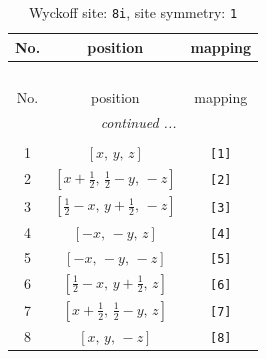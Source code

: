 \documentclass[fleqn,8pt]{jsarticle}
\begin{document}
\renewcommand{\arraystretch}{1.2}
\begin{longtable}{ccc}
\caption{Wyckoff site: {\tt 8i}, site symmetry: {\tt 1}}
 \\
 \hline \hline
No. & position & mapping \\ \hline \endfirsthead

\multicolumn{2}{l}{\tablename\ \thetable{}} \\
 \hline \hline
No. & position & mapping \\ \hline \endhead

 \hline \hline
\multicolumn{2}{r}{\footnotesize\it continued ...} \\ \endfoot

 \hline \hline
\multicolumn{2}{r}{} \\ \endlastfoot

1 & $\left[ x,\, y,\, z \right]$ & {\tt [1]} \\ \hline
2 & $\left[ x + \frac{1}{2},\, \frac{1}{2} - y,\, - z \right]$ & {\tt [2]} \\ \hline
3 & $\left[ \frac{1}{2} - x,\, y + \frac{1}{2},\, - z \right]$ & {\tt [3]} \\ \hline
4 & $\left[ - x,\, - y,\, z \right]$ & {\tt [4]} \\ \hline
5 & $\left[ - x,\, - y,\, - z \right]$ & {\tt [5]} \\ \hline
6 & $\left[ \frac{1}{2} - x,\, y + \frac{1}{2},\, z \right]$ & {\tt [6]} \\ \hline
7 & $\left[ x + \frac{1}{2},\, \frac{1}{2} - y,\, z \right]$ & {\tt [7]} \\ \hline
8 & $\left[ x,\, y,\, - z \right]$ & {\tt [8]} \\
\end{longtable}
\end{document}
